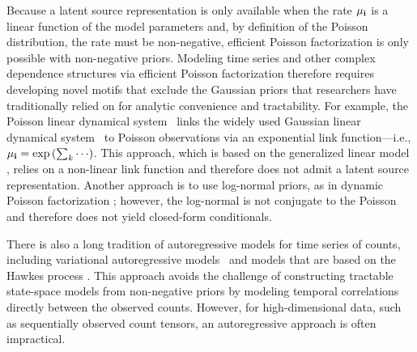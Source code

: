\documentclass{article}
\begin{document}
Because a latent source representation is only available when the rate $\mu_{\textbf{\textrm{i}}}$ is a linear function of the model parameters and, by definition of the Poisson distribution, the rate must be non-negative, efficient Poisson factorization is only possible with non-negative priors. Modeling time series and other complex dependence structures via efficient Poisson factorization therefore requires developing novel motifs that exclude the Gaussian priors that researchers have traditionally relied on for analytic convenience and tractability. For example, the Poisson linear dynamical system~\cite{smith2003estimating, paninski2010new, macke2011empirical} links the widely used Gaussian linear dynamical system~\cite{kalman1961new,ghahramani1999learning} to Poisson observations via an exponential link function---i.e., $\mu_{\textbf{\textrm{i}}} = \exp\left({\sum_k \cdots}\right)$. This approach, which is based on the generalized linear model \cite{nelder1972generalized}, relies on a non-linear link function and therefore does not admit a latent source representation. Another approach is to use log-normal priors, as in dynamic Poisson factorization \cite{charlin2015dynamic}; however, the log-normal is not conjugate to the Poisson and therefore does not yield closed-form conditionals.

There is also a long tradition of autoregressive models for time series of counts, including variational autoregressive models~\cite{brandt2012bayesian} and models that are based on the Hawkes process \cite{hawkes1971spectra,blundell2012modelling,simma2012modeling,linderman2014discovering}. This approach avoids the challenge of constructing tractable state-space models from non-negative priors by modeling temporal correlations directly between the observed counts. However, for high-dimensional data, such as sequentially observed count tensors, an autoregressive approach is often impractical.~



\end{document}
